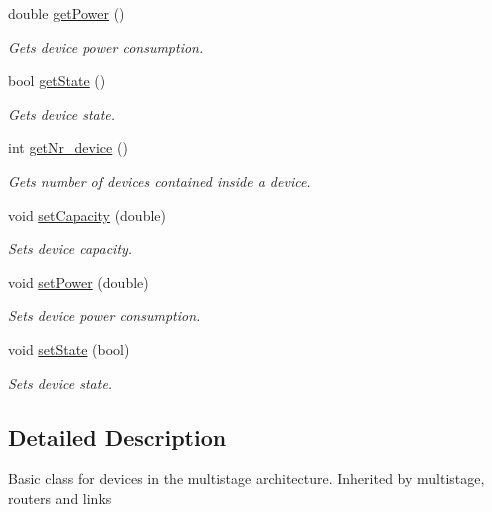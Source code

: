 \begin{DoxyCompactItemize}
double \hyperlink{classdevice_af7b6d78ad457ad75a5f3ed2b40266017}{getPower} ()
\begin{DoxyCompactList}\small\item\em Gets device power consumption. \item\end{DoxyCompactList}\item 
bool \hyperlink{classdevice_a287ef719b436c552cb78f498869ce590}{getState} ()
\begin{DoxyCompactList}\small\item\em Gets device state. \item\end{DoxyCompactList}\item 
int \hyperlink{classdevice_aba1387d01eac1fa58a5386395b368384}{getNr\_\-device} ()
\begin{DoxyCompactList}\small\item\em Gets number of devices contained inside a device. \item\end{DoxyCompactList}\item 
void \hyperlink{classdevice_a66b66e2bce25b091d651ee6336f6f40e}{setCapacity} (double)
\begin{DoxyCompactList}\small\item\em Sets device capacity. \item\end{DoxyCompactList}\item 
void \hyperlink{classdevice_a43b8093ad785d5b5787751a7ede0ae73}{setPower} (double)
\begin{DoxyCompactList}\small\item\em Sets device power consumption. \item\end{DoxyCompactList}\item 
void \hyperlink{classdevice_a8479767364d2d7a6e349552eb6bae023}{setState} (bool)
\begin{DoxyCompactList}\small\item\em Sets device state. \item\end{DoxyCompactList}\end{DoxyCompactItemize}


\subsection{Detailed Description}
Basic class for devices in the multistage architecture. Inherited by multistage, routers and links 

